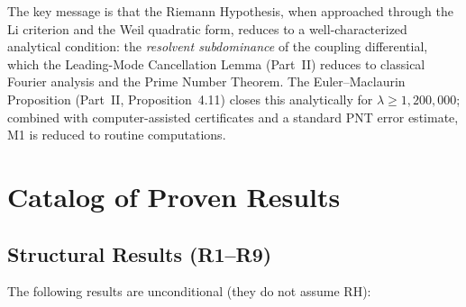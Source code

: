 \documentclass[12pt,a4paper]{article}
\theoremstyle{definition}
\theoremstyle{remark}
\begin{document}
The key message is that the Riemann Hypothesis, when approached through the Li criterion and the Weil quadratic form, reduces to a well-characterized analytical condition: the \emph{resolvent subdominance} of the coupling differential, which the Leading-Mode Cancellation Lemma (Part~II) reduces to classical Fourier analysis and the Prime Number Theorem. The Euler--Maclaurin Proposition (Part~II, Proposition~4.11) closes this analytically for $\lambda \geq 1{,}200{,}000$; combined with computer-assisted certificates and a standard PNT error estimate, M1 is reduced to routine computations.


\section{Catalog of Proven Results}
\label{sec:catalog}

\subsection{Structural Results (R1--R9)}

The following results are unconditional (they do not assume RH):
\end{document}
